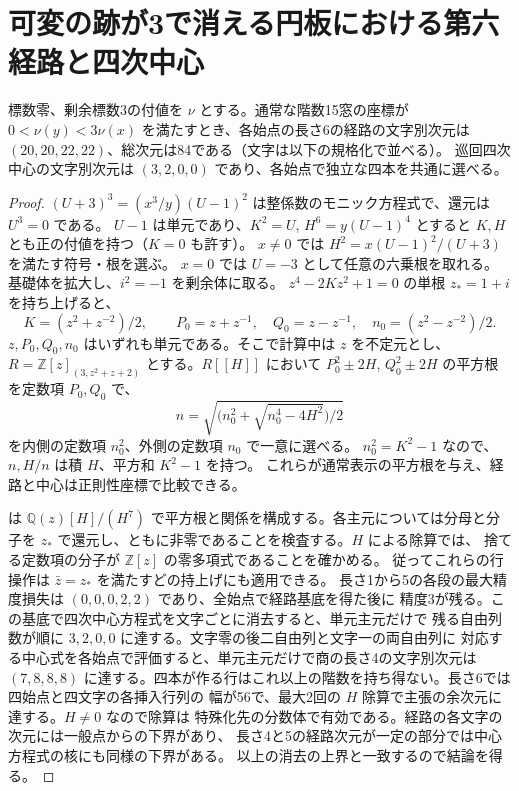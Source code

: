 \section{可変の跡が3で消える円板における第六経路と四次中心}
\label{sec:rank-fifteen-variable-zero-disk}
\begin{theorem}\label{thm:rank-fifteen-variable-zero-disk}
標数零、剰余標数3の付値を $\nu$ とする。通常な階数15窓の座標が
$0<\nu(y)<3\nu(x)$ を満たすとき、各始点の長さ6の経路の文字別次元は
$(20,20,22,22)$、総次元は84である（文字は以下の規格化で並べる）。
巡回四次中心の文字別次元は $(3,2,0,0)$ であり、各始点で独立な四本を共通に選べる。
\end{theorem}
\begin{proof}
$(U+3)^3=(x^3/y)(U-1)^2$ は整係数のモニック方程式で、還元は $U^3=0$ である。
$U-1$ は単元であり、$K^2=U$, $H^6=y(U-1)^4$ とすると $K,H$ とも正の付値を持つ（$K=0$ も許す）。
$x\ne0$ では $H^2=x(U-1)^2/(U+3)$ を満たす符号・根を選ぶ。
$x=0$ では $U=-3$ として任意の六乗根を取れる。基礎体を拡大し、$i^2=-1$ を剰余体に取る。
$z^4-2Kz^2+1=0$ の単根 $z_*=1+i$ を持ち上げると、
\[
 K=(z^2+z^{-2})/2,\qquad P_0=z+z^{-1},\quad Q_0=z-z^{-1},\quad n_0=(z^2-z^{-2})/2 .
\]
$z,P_0,Q_0,n_0$ はいずれも単元である。そこで計算中は $z$ を不定元とし、
$R=\mathbb Z[z]_{(3,z^2+z+2)}$ とする。$R[[H]]$ において
$P_0^2\pm2H$, $Q_0^2\pm2H$ の平方根を定数項 $P_0,Q_0$ で、
\[
 n=\sqrt{\bigl(n_0^2+\sqrt{n_0^4-4H^2}\bigr)/2}
\]
を内側の定数項 $n_0^2$、外側の定数項 $n_0$ で一意に選べる。
$n_0^2=K^2-1$ なので、$n,H/n$ は積 $H$、平方和 $K^2-1$ を持つ。
これらが通常表示の平方根を与え、経路と中心は正則性座標で比較できる。

 は
$\mathbb Q(z)[H]/(H^7)$ で平方根と関係を構成する。各主元については分母と分子を
$z_*$ で還元し、ともに非零であることを検査する。$H$ による除算では、
捨てる定数項の分子が $\mathbb Z[z]$ の零多項式であることを確かめる。
従ってこれらの行操作は $\bar z=z_*$ を満たすどの持上げにも適用できる。
長さ1から5の各段の最大精度損失は $(0,0,0,2,2)$ であり、全始点で経路基底を得た後に
精度3が残る。この基底で四次中心方程式を文字ごとに消去すると、単元主元だけで
残る自由列数が順に $3,2,0,0$ に達する。文字零の後二自由列と文字一の両自由列に
対応する中心式を各始点で評価すると、単元主元だけで商の長さ4の文字別次元は
$(7,8,8,8)$ に達する。四本が作る行はこれ以上の階数を持ち得ない。長さ6では四始点と四文字の各挿入行列の
幅が56で、最大2回の $H$ 除算で主張の余次元に達する。$H\ne0$ なので除算は
特殊化先の分数体で有効である。経路の各文字の次元には一般点からの下界があり、
長さ4と5の経路次元が一定の部分では中心方程式の核にも同様の下界がある。
以上の消去の上界と一致するので結論を得る。
\end{proof}

